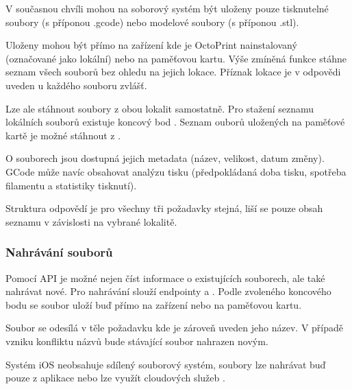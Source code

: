 V současnou chvíli mohou na soborový systém být uloženy pouze tisknutelné soubory (s příponou .gcode) nebo modelové soubory (s příponou .stl).

Uloženy mohou být přímo na zařízení kde je OctoPrint nainstalovaný (označované jako lokální) nebo na paměťovou kartu.
Výše zmíněná funkce stáhne seznam všech souborů bez ohledu na jejich lokace.
Příznak lokace je v odpovědi uveden u každého souboru zvlášť.

Lze ale stáhnout soubory z obou lokalit samostatně.
Pro stažení seznamu lokálních souborů existuje koncový bod .
Seznam ouborů uložených na paměťové kartě je možné stáhnout z .

O souborech jsou dostupná jejich metadata (název, velikost, datum změny).
GCode může navíc obsahovat analýzu tisku (předpokládaná doba tisku, spotřeba filamentu a statistiky tisknutí).

Struktura odpovědí je pro všechny tři požadavky stejná, liší se pouze obsah seznamu v závislosti na vybrané lokalitě.

\subsubsection*{Nahrávání souborů}

Pomocí API je možné nejen číst informace o existujících souborech, ale také nahrávat nové.
Pro nahrávání slouží endpointy  a .
Podle zvoleného koncového bodu se soubor uloží buď přímo na zařízení nebo na paměťovou kartu.

Soubor se odesílá v těle požadavku kde je zároveň uveden jeho název.
V případě vzniku konfliktu názvů bude stávající soubor nahrazen novým.

Systém iOS neobsahuje sdílený souborový systém, soubory lze nahrávat buď pouze z aplikace nebo lze využít cloudových služeb \cite{apple-file-system-basics}.
